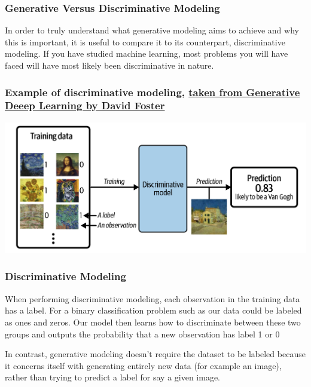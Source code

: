 \documentclass{beamer}
\begin{document}
\begin{frame}
\frametitle{Generative Versus Discriminative Modeling}

In order to truly understand what generative modeling aims to achieve
and why this is important, it is useful to compare it to its
counterpart, discriminative modeling. If you have studied machine
learning, most problems you will have faced will have most likely been
discriminative in nature.
\end{frame}

\begin{frame}
\frametitle{Example of discriminative modeling, \href{{https://www.oreilly.com/library/view/generative-deep-learning/9781098134174/ch01.html}}{taken from Generative Deeep Learning by David Foster}}

\vspace{6mm}

\centerline{\includegraphics[width=1.0\linewidth]{figures/standarddeeplearning.png}}

\vspace{6mm}
\end{frame}

\begin{frame}
\frametitle{Discriminative Modeling}

When performing discriminative modeling, each observation in the
training data has a label. For a binary classification problem such as
our data could be labeled as ones and zeros. Our model then learns how to
discriminate between these two groups and outputs the probability that
a new observation has label 1 or 0

In contrast, generative modeling doesn’t require the dataset to be
labeled because it concerns itself with generating entirely new
data (for example an image), rather than trying to predict a label for say  a given image.
\end{frame}
\end{document}
